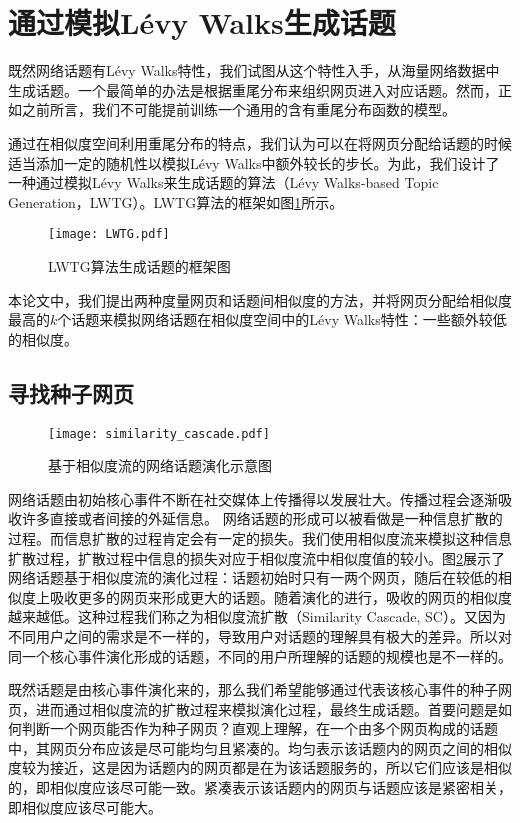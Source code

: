 \section{通过模拟L\'{e}vy Walks生成话题}
既然网络话题有L\'{e}vy Walks特性，我们试图从这个特性入手，从海量网络数据中生成话题。一个最简单的办法是根据重尾分布来组织网页进入对应话题。然而，正如之前所言，我们不可能提前训练一个通用的含有重尾分布函数的模型。

通过在相似度空间利用重尾分布的特点，我们认为可以在将网页分配给话题的时候适当添加一定的随机性以模拟L\'{e}vy Walks中额外较长的步长。为此，我们设计了一种通过模拟L\'{e}vy Walks来生成话题的算法（L\'{e}vy Walks-based Topic Generation，LWTG）。LWTG算法的框架如图\ref{fig:LWTG}所示。
\begin{figure}[!htbp]
    \centering
    \texttt{[image: LWTG.pdf]}
    \caption{LWTG算法生成话题的框架图}
    \label{fig:LWTG}
\end{figure}

本论文中，我们提出两种度量网页和话题间相似度的方法，并将网页分配给相似度最高的$k$个话题来模拟网络话题在相似度空间中的L\'evy Walks特性：一些额外较低的相似度。

\subsection{寻找种子网页}
\begin{figure}[!htbp]
    \centering
    \texttt{[image: similarity\_cascade.pdf]}
    \caption{基于相似度流的网络话题演化示意图}
    \label{fig:similarity_cascade}
\end{figure}
网络话题由初始核心事件不断在社交媒体上传播得以发展壮大。传播过程会逐渐吸收许多直接或者间接的外延信息。
网络话题的形成可以被看做是一种信息扩散的过程。而信息扩散的过程肯定会有一定的损失。我们使用相似度流来模拟这种信息扩散过程，扩散过程中信息的损失对应于相似度流中相似度值的较小。图\ref{fig:similarity_cascade}展示了网络话题基于相似度流的演化过程：话题初始时只有一两个网页，随后在较低的相似度上吸收更多的网页来形成更大的话题。随着演化的进行，吸收的网页的相似度越来越低。这种过程我们称之为相似度流扩散（Similarity Cascade, SC）。又因为不同用户之间的需求是不一样的，导致用户对话题的理解具有极大的差异。所以对同一个核心事件演化形成的话题，不同的用户所理解的话题的规模也是不一样的。

既然话题是由核心事件演化来的，那么我们希望能够通过代表该核心事件的种子网页，进而通过相似度流的扩散过程来模拟演化过程，最终生成话题。首要问题是如何判断一个网页能否作为种子网页？直观上理解，在一个由多个网页构成的话题中，其网页分布应该是尽可能均匀且紧凑的。均匀表示该话题内的网页之间的相似度较为接近，这是因为话题内的网页都是在为该话题服务的，所以它们应该是相似的，即相似度应该尽可能一致。紧凑表示该话题内的网页与话题应该是紧密相关，即相似度应该尽可能大。

